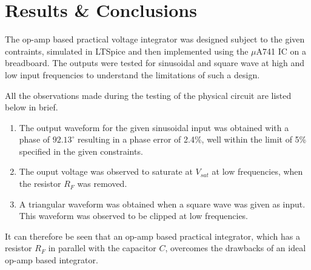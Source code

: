 \documentclass[12pt, titlepage]{article}
\theoremstyle{definition}
\begin{document}
  \clearpage
  \section{Results \& Conclusions}
  The op-amp based practical voltage integrator was designed subject to the given contraints, simulated in LTSpice and then implemented using the $\mu $A741 IC on a breadboard. The outputs were tested for sinusoidal and square wave at high and low input frequencies to understand the limitations of such a design.

  All the observations made during the testing of the physical circuit are listed below in brief.
  \begin{enumerate}
  \item The output waveform for the given sinusoidal input was obtained with a phase of $92.13^{\circ}$ resulting in a phase error of 2.4\%, well within the limit of 5\% specified in the given constraints.
  \item The ouput voltage was observed to saturate at $V_{sat}$ at low frequencies, when the resistor $R_{F}$ was removed.
  \item A triangular waveform was obtained when a square wave was given as input. This waveform was observed to be clipped at low frequencies.
  \end{enumerate}

  It can therefore be seen that an op-amp based practical integrator, which has a resistor $R_{F}$ in parallel with the capacitor $C$, overcomes the drawbacks of an ideal op-amp based integrator.
\end{document}
